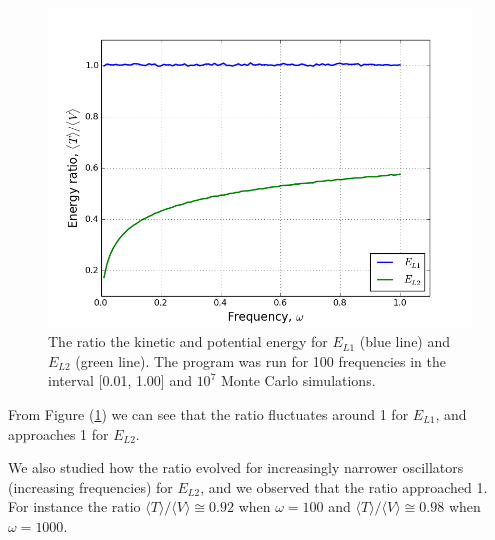 \documentclass[norsk,a4paper,12pt]{article}
\begin{document}
\begin{figure} [H]
    \centering
    \includegraphics[width=12cm]{energy_ratio_1e7.png}
    \caption{The ratio the kinetic and potential energy for $E_{L1}$ (blue line) and $E_{L2}$ (green line). The program was run for 100 frequencies in the interval [0.01, 1.00] and $10^7$ Monte Carlo simulations.}
    \label{fig:ratio}
\end{figure}
From Figure (\ref{fig:ratio}) we can see that the ratio fluctuates around 1 for $E_{L1}$, and approaches 1 for $E_{L2}$.

We also studied how the ratio evolved for increasingly narrower oscillators (increasing frequencies) for $E_{L2}$, and we observed that the ratio approached 1. For instance the ratio $\langle T\rangle/\langle V\rangle\cong0.92$ when $\omega=100$ and $\langle T\rangle/\langle V\rangle\cong0.98$ when $\omega=1000$.
\end{document}
